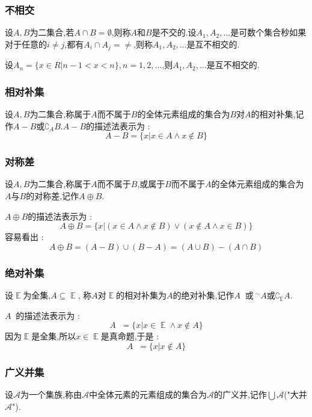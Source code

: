 \documentclass[UTF8,12pt]{ctexbook}
\DeclareMathOperator{\mathEverythingCollection}{\mathbb{E}}
\DeclareMathOperator{\unionSet}{\cup}
\DeclareMathOperator{\intersectionSet}{\cap}
\DeclareMathOperator{\absoluteCompletementSet}{^\complement}
\begin{document}
{{{{\subsubsection{不相交}{
  设$A,B$为二集合,若$A \intersectionSet B = \emptyset$,则称$A$和$B$是不交的.设$A_1,A_2,\dots$是可数个集合秒如果对于任意的$i \neq j$,都有$A_i \intersectionSet A_j = \neq$,则称$A_1,A_2,\dots$是互不相交的.

  设$A_n = \{x \in R | n - 1 < x < n\},n = 1,2,\dots$,则$A_1,A_2,\dots$是互不相交的.
}%

\subsubsection{相对补集}{
  设$A,B$为二集合,称属于$A$而不属于$B$的全体元素组成的集合为$B$对$A$的相对补集,记作$A - B$或$\complement_A B$.$A - B$的描述法表示为 : $$
    A - B = \{x | x \in A \land x \notin B\}
  $$
}%

\subsubsection{对称差}{
  设$A,B$为二集合,称属于$A$而不属于$B$,或属于$B$而不属于$A$的全体元素组成的集合为$A$与$B$的对称差,记作$A \oplus B$.

  $A \oplus B$的描述法表示为 : $$
    A \oplus B = \{x | (x \in A \land x \notin B) \lor (x \notin A \land x \in B)\}
  $$
  容易看出 : $$
    A \oplus B = (A - B) \unionSet (B - A) = (A \unionSet B) - (A \intersectionSet B)
  $$
}%

\subsubsection{绝对补集}{
  设$\mathEverythingCollection$为全集,$A \subseteq \mathEverythingCollection$, 称$A$对$\mathEverythingCollection$的相对补集为$A$的绝对补集,记作$A\absoluteCompletementSet$或${~}^\sim A$或$\complement_{\mathEverythingCollection} A$.

  $A\absoluteCompletementSet$的描述法表示为 : $$
    A\absoluteCompletementSet = \{x | x \in \mathEverythingCollection \land x \notin A\}
  $$
  因为$\mathEverythingCollection$是全集,所以$x \in \mathEverythingCollection$是真命题,于是 : $$
    A\absoluteCompletementSet = \{x | x \notin A\}
  $$
}%

\subsubsection{广义并集}{
  设$\mathcal{A}$为一个集族,称由$\mathcal{A}$中全体元素的元素组成的集合为$\mathcal{A}$的广义并,记作$\bigcup \mathcal{A}$("大并$\mathcal{A}$").

}}}}}
\end{document}
